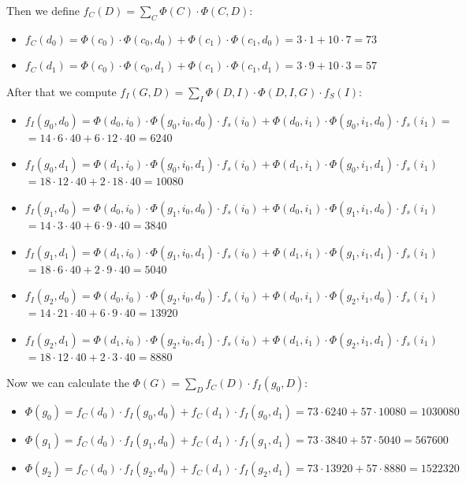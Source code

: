 \documentclass[11pt,a4paper]{article}
\begin{document}
	Then we define $f_C(D) = \sum_{C}\Phi(C) \cdot \Phi(C,D):$
	\begin{itemize}
		\item $ f_C(d_0) = \Phi(c_0) \cdot \Phi(c_0,d_0) + \Phi(c_1) \cdot \Phi(c_1
		,d_0) = 3 \cdot 1 + 10 \cdot 7 = 73 $
		\item $ f_C(d_1) = \Phi(c_0) \cdot \Phi(c_0,d_1) + \Phi(c_1) \cdot \Phi(c_1
		,d_1) = 3 \cdot 9 + 10 \cdot 3 = 57 $
	\end{itemize}
	
	After that we compute $ f_I(G, D) = \sum_I \Phi(D, I) \cdot \Phi(D, I, G) \cdot f_S(I): $
	\begin{itemize}
		\item $ f_I(g_0, d_0) = \Phi(d_0,i_0) \cdot \Phi(g_0,i_0,d_0) \cdot f_s(i_0) + \Phi(d_0,i_1) \cdot \Phi(g_0,i_1,d_0) \cdot f_s(i_1) = $ \\
		$ = 14 \cdot 6 \cdot 40 + 6 \cdot 12 \cdot 40 = 6240 $
		\item $ f_I(g_0, d_1) = \Phi(d_1,i_0) \cdot \Phi(g_0,i_0,d_1) \cdot f_s(i_0) + \Phi(d_1,i_1) \cdot \Phi(g_0,i_1,d_1) \cdot f_s(i_1) $ \\
		$ = 18 \cdot 12 \cdot 40 + 2 \cdot 18 \cdot 40 = 10080 $
		\item $ f_I(g_1, d_0) = \Phi(d_0,i_0) \cdot \Phi(g_1,i_0,d_0) \cdot f_s(i_0) + \Phi(d_0,i_1) \cdot \Phi(g_1,i_1,d_0) \cdot f_s(i_1) $ \\
		$ = 14 \cdot 3 \cdot 40 + 6 \cdot 9 \cdot 40 = 3840 $
		\item $ f_I(g_1, d_1) = \Phi(d_1,i_0) \cdot \Phi(g_1,i_0,d_1) \cdot f_s(i_0) + \Phi(d_1,i_1) \cdot \Phi(g_1,i_1,d_1) \cdot f_s(i_1) $ \\
		$ = 18 \cdot 6 \cdot 40 + 2 \cdot 9 \cdot 40 = 5040 $
		\item $ f_I(g_2, d_0) = \Phi(d_0,i_0) \cdot \Phi(g_2,i_0,d_0) \cdot f_s(i_0) + \Phi(d_0,i_1) \cdot \Phi(g_2,i_1,d_0) \cdot f_s(i_1) $ \\
		$ = 14 \cdot 21 \cdot 40 + 6 \cdot 9 \cdot 40 = 13920 $
		\item $ f_I(g_2, d_1) = \Phi(d_1,i_0) \cdot \Phi(g_2,i_0,d_1) \cdot f_s(i_0) + \Phi(d_1,i_1) \cdot \Phi(g_2,i_1,d_1) \cdot f_s(i_1) $ \\
		$ = 18 \cdot 12 \cdot 40 + 2 \cdot 3 \cdot 40 = 8880 $
	\end{itemize}
	
	Now we can calculate the $\Phi(G) = \sum_D f_C(D) \cdot f_I(g_0, D): $
	\begin{itemize}
		\item $\Phi(g_0) = f_C(d_0) \cdot f_I(g_0, d_0) + f_C(d_1) \cdot f_I(g_0, d_1)  = 73 \cdot 6240 + 57 \cdot 10080 = 1030080 $
		\item $\Phi(g_1) = f_C(d_0) \cdot f_I(g_1, d_0) + f_C(d_1) \cdot f_I(g_1, d_1)  = 73 \cdot 3840 + 57 \cdot 5040 = 567600 $
		\item $\Phi(g_2) = f_C(d_0) \cdot f_I(g_2, d_0) + f_C(d_1) \cdot f_I(g_2, d_1)= 73 \cdot 13920 + 57 \cdot 8880 = 1522320 $
	\end{itemize}
	
\end{document}
